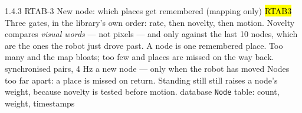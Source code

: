 \begin{frame}{1.4.3 \;RTAB-3 \;New node: which places get remembered \;(mapping only)}
  \hl{RTAB3}
  {Three gates, in the library's own order: rate, then novelty, then motion.
   Novelty compares \emph{visual words} --- not pixels --- and only against the
   last 10 nodes, which are the ones the robot just drove past.}
  {A node is one remembered place. Too many and the map bloats; too few and
   places are missed on the way back.}
  {synchronised pairs, 4 Hz}
  {a new node --- only when the robot has moved}
  {Nodes too far apart: a place is missed on return. Standing still still raises a node's weight, because novelty is tested before motion.}
  {database \texttt{Node} table: count, weight, timestamps}
\end{frame}

